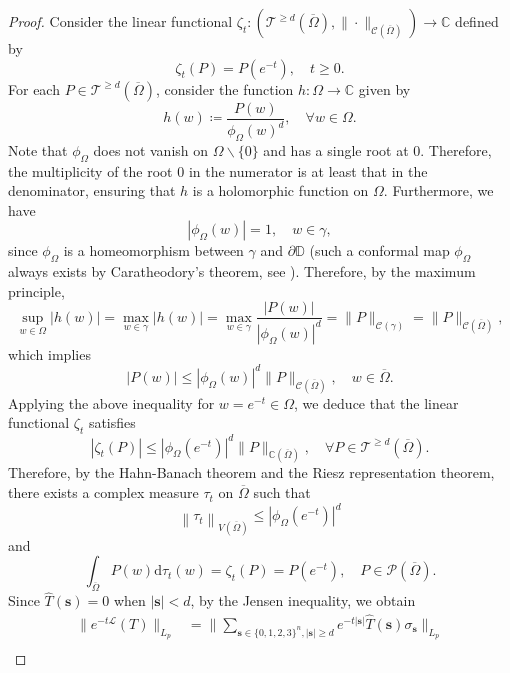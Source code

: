 \documentclass{amsbook}
\theoremstyle{definition}
\theoremstyle{remark}
\numberwithin{section}{chapter}
\numberwithin{equation}{chapter}
\newcommand{\1}{\mathbf{1}}
\begin{document}
\begin{proof}
Consider the linear functional $\zeta_{t}:\left(\mathcal{T}^{\geq d}(\overline{\Omega}),\|\cdot\|_{\mathcal{C}(\overline{\Omega})}\right) \rightarrow \mathbb{C}$ defined by
\[
\zeta_{t}(P)=P(e^{-t}), \quad t\geq 0.
\]
For each $P\in \mathcal{T}^{\geq d}(\overline{\Omega})$, consider the function $h: \Omega \rightarrow \mathbb{C}$ given by
\[
h(w)\coloneqq\frac{P(w)}{\phi_{\Omega}(w)^{d}},\quad \forall w \in \Omega.
\]
Note that $\phi_{\Omega}$ does not vanish on $\Omega \backslash\{0\}$ and  has a single root at $0$. Therefore, the multiplicity of the root $0$ in the numerator is at least that in the denominator, ensuring that  $h$ is a holomorphic function on $\Omega$. Furthermore,  we have $$|\phi_{\Omega}(w)|=1,\quad w \in \gamma,$$ 
since $\phi_{\Omega}$ is a homeomorphism between $\gamma$ and $\partial \mathbb{D}$ (such a conformal map $\phi_{\Omega}$ always exists by Caratheodory's theorem, see \cite[Theorem 5.1.1]{K2006}). Therefore, by the maximum principle,
$$
\sup _{w \in \Omega}|h(w)|=\max _{w \in \gamma}|h(w)|=\max _{w \in \gamma} \frac{|P(w)|}{|\phi_{\Omega}(w)|^{d}}=\|P\|_ {\mathcal{C}(\gamma)}=\|P\|_{\mathcal{C}(\overline{\Omega})},$$
which implies 
$$|P(w)| \leq|\phi_{\Omega}(w)|^{d}\|P\|_{\mathcal{C}(\overline{\Omega})},\quad w \in \overline{\Omega}.$$
Applying the above inequality for $w=e^{-t} \in \Omega$, we deduce that the linear functional $\zeta_{t}$ satisfies
\begin{equation}\label{zeta-b}
\left|\zeta_{t}(P)\right| \leq\left|\phi_{\Omega}\left(e^{-t}\right)\right|^{d}\|P\|_{\mathbb{C}(\overline{\Omega})},\quad \forall P \in\mathcal{T}^{\geq d}(\overline{\Omega}) .
\end{equation}
Therefore, by the Hahn-Banach theorem and the Riesz representation theorem, there exists a complex measure $\tau_{t}$ on $\overline{\Omega}$ such that $$\left\|\tau_{t}\right\|_{V(\overline{\Omega})} \leq\left|\phi_{\Omega}\left(e^{-t}\right)\right|^{d}$$ 
and
\begin{equation}\label{p-zeta-i}
\int_{\overline{\Omega}} P(w) \mathrm{d} \tau_{t}(w)=\zeta_{t}(P)=P\left(e^{-t}\right), \quad P \in\mathcal{P}(\overline{\Omega}). 
\end{equation}
Since $\widehat{T}(\mathbf{s})=0$ when $|\mathbf{s}|<d$, by the Jensen inequality, we obtain
\begin{align*}
\|e^{-t \mathcal{L}}(T) \|_{L_{p}}
&=\Big\|\sum_{\mathbf{s}\in\{0,1,2,3\}^n,|\mathbf{s}|\geq d}e^{-t |\mathbf{s}|}\widehat{T}(\mathbf{s}) \sigma_{\mathbf{s}}\Big\|_{L_{p}}\\

\end{align*}
\end{proof}
\end{document}
